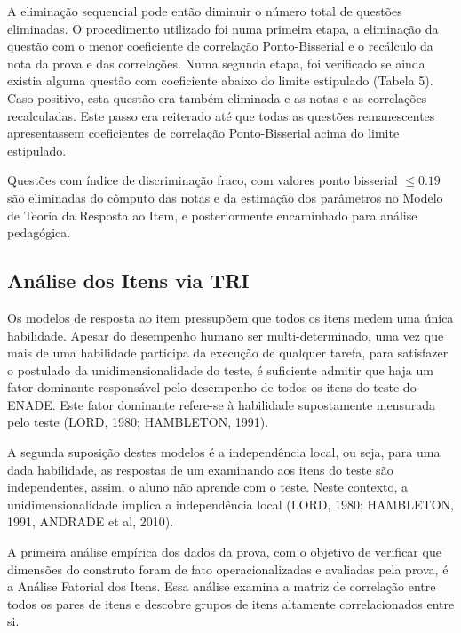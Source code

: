 \documentclass[12pt]{article}
\begin{document}
A eliminação sequencial pode então diminuir o número total de questões eliminadas. O procedimento utilizado foi numa primeira etapa, a eliminação da questão com o menor coeficiente de correlação Ponto-Bisserial e o recálculo da nota da prova e das correlações. Numa segunda etapa, foi verificado se ainda existia alguma questão com coeficiente abaixo do limite estipulado (Tabela 5). Caso positivo, esta questão era também eliminada e as notas e as correlações recalculadas. Este passo era reiterado até que todas as questões remanescentes apresentassem coeficientes de correlação Ponto-Bisserial acima do limite estipulado.

Questões com índice de discriminação fraco, com valores ponto bisserial $≤ 0.19$ são eliminadas do cômputo das notas e da estimação dos parâmetros no Modelo de Teoria da Resposta ao Item, e posteriormente encaminhado para análise pedagógica.






  










\subsection{Análise dos Itens via TRI}

Os modelos de resposta ao item pressupõem que todos os itens medem uma única habilidade. Apesar do desempenho humano ser multi-determinado, uma vez que mais de uma habilidade participa da execução de qualquer tarefa, para satisfazer o postulado da unidimensionalidade do teste, é suficiente admitir que haja um fator dominante responsável pelo desempenho de todos os itens do teste do ENADE.  Este fator dominante refere-se à habilidade supostamente mensurada pelo teste (LORD, 1980; HAMBLETON, 1991).

A segunda suposição destes modelos é a independência local, ou seja, para uma dada habilidade, as respostas de um examinando aos itens do teste são independentes, assim, o aluno não aprende com o teste. Neste contexto, a unidimensionalidade implica a independência local (LORD, 1980; HAMBLETON, 1991, ANDRADE et al, 2010).

A primeira análise empírica dos dados da prova, com o objetivo de verificar que dimensões do construto foram de fato operacionalizadas e avaliadas pela prova, é a Análise Fatorial dos Itens. Essa análise examina a matriz de correlação entre todos os pares de itens e descobre grupos de itens altamente correlacionados entre si. 
\end{document}
